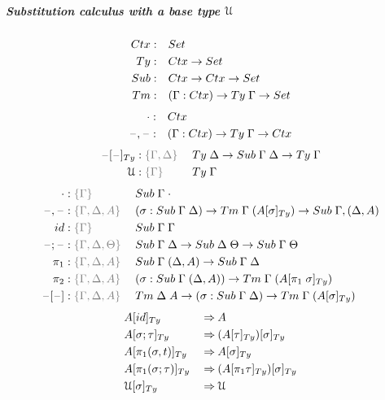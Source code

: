 \documentclass[a4paper,UKenglish,numberwithinsect,cleveref,thm-restate]{lipics-v2021}
\begin{document}
\subparagraph*{Substitution calculus with a base type $\mathcal{U}$}
\begin{alignat*}{3}
  \Ctx      & : && \Set                   \\
  \Ty       & : && \Ctx \to \Set          \\
  \Sub      & : && \Ctx \to \Ctx \to \Set \\
  \Tm       & : && (\Gamma : \Ctx) \to \Ty\;\Gamma \to \Set
\end{alignat*}
\begin{alignat*}{5}
  \emptyctx & : && \Ctx \\
  \blank,\blank & : && (\Gamma : \Ctx) \to \Ty\;\Gamma \to \Ctx
\end{alignat*}
\begin{alignat*}{5}
\subTy{\blank}{\blank} & : \implicit{\Gamma, \Delta}\; && \Ty\;\Delta \to \Sub\;\Gamma\;\Delta \to \Ty\;\Gamma \\
  \UU     & : \implicit{\Gamma}\; && \Ty\; \Gamma
\end{alignat*}
\begin{alignat*}{5}
  \emptysub & : \implicit{\Gamma} && \Sub\;\Gamma\;\emptyctx \\
  \blank,\blank & : \implicit{\Gamma, \Delta, A} && (\sigma : \Sub\;\Gamma\;\Delta) \to \Tm\;\Gamma\;(\subTy{A}{\sigma}) \to \Sub\;\Gamma,(\Delta, A) \\
  \idS & : \implicit{\Gamma} && \Sub\;\Gamma\;\Gamma \\
  \blank;\blank & : \implicit{\Gamma, \Delta, \Theta} && \Sub\;\Gamma\;\Delta \to \Sub\;\Delta\;\Theta \to \Sub\;\Gamma\;\Theta \\
  \pi_1 & : \implicit{\Gamma, \Delta, A}\; && \Sub\;\Gamma\;(\Delta, A) \to \Sub\;\Gamma\;\Delta \\
  \pi_2 & : \implicit{\Gamma, \Delta, A}\; && (\sigma : \Sub\;\Gamma\;(\Delta, A)) \to \Tm\;\Gamma\;(\subTy{A}{\pi_1\;\sigma}) \\
  \sub{\blank}{\blank} & : \implicit{\Gamma,\Delta, A} && \Tm\;\Delta\;A \to (\sigma : \Sub\;\Gamma\;\Delta) \to \Tm\;\Gamma\;(\subTy{A}{\sigma})
\end{alignat*}
\begin{alignat*}{3}
  & \subTy{A}{\idS}           && \reduce A \\
  & \subTy{A}{\sigma ; \tau}  && \reduce \subTy{(\subTy{A}{\tau})}{\sigma} \\
  & \subTy{A}{\pi_1(\sigma, t)} && \reduce \subTy{A}{\sigma} \\
  & \subTy{A}{\pi_1(\sigma; \tau)} && \reduce \subTy{(\subTy{A}{\pi_1\tau})}{\sigma} \\
  & \subTy{\UU}{\sigma} && \reduce \UU
\end{alignat*}
\end{document}
